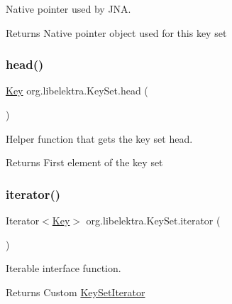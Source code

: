 Native pointer used by J\+NA. 

\begin{DoxyReturn}{Returns}
Native pointer object used for this key set 
\end{DoxyReturn}
\mbox{\label{classorg_1_1libelektra_1_1KeySet_a11ba1ef1213a9f1ac5743491bc7154e5}} 
\subsubsection{\texorpdfstring{head()}{head()}}
{\footnotesize\ttfamily \hyperlink{classorg_1_1libelektra_1_1Key}{Key} org.\+libelektra.\+Key\+Set.\+head (\begin{DoxyParamCaption}{ }\end{DoxyParamCaption})\hspace{0.3cm}{\ttfamily [inline]}}



Helper function that gets the key set head. 

\begin{DoxyReturn}{Returns}
First element of the key set 
\end{DoxyReturn}
\mbox{\label{classorg_1_1libelektra_1_1KeySet_a1a3b37dff55df600c4fee6bea714a8d9}} 
\subsubsection{\texorpdfstring{iterator()}{iterator()}}
{\footnotesize\ttfamily Iterator$<$\hyperlink{classorg_1_1libelektra_1_1Key}{Key}$>$ org.\+libelektra.\+Key\+Set.\+iterator (\begin{DoxyParamCaption}{ }\end{DoxyParamCaption})\hspace{0.3cm}{\ttfamily [inline]}}



Iterable interface function. 

\begin{DoxyReturn}{Returns}
Custom \hyperlink{classorg_1_1libelektra_1_1KeySetIterator}{Key\+Set\+Iterator} 
\end{DoxyReturn}
\mbox{\label{classorg_1_1libelektra_1_1KeySet_aac3920fa38179de07bcd242207915540}} 
